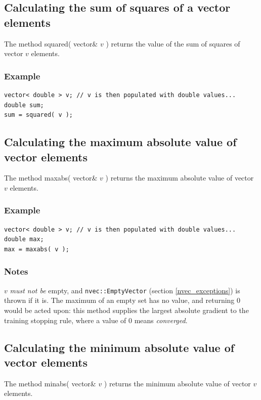\documentclass{report}
\begin{document}
\subsection{Calculating the sum of squares of a vector elements}

The method squared( vector\& $v$ ) returns the value of the sum of
squares of vector $v$ elements.

\subsubsection{Example}
\begin{verbatim}
vector< double > v; // v is then populated with double values...
double sum;
sum = squared( v );
\end{verbatim}

\subsection{Calculating the maximum absolute value of vector elements}

The method maxabs( vector\& $v$ ) returns the maximum absolute value
of vector $v$ elements.

\subsubsection{Example}
\begin{verbatim}
vector< double > v; // v is then populated with double values...
double max;
max = maxabs( v );
\end{verbatim}

\subsubsection{Notes}
$v$ {\em must not be} empty, and \texttt{nvec::EmptyVector} (section
\ref{nvec_exceptions}) is thrown if it is.  The maximum of an empty set
has no value, and returning 0 would be acted upon: this method supplies
the largest absolute gradient to the training stopping rule, where a
value of 0 means {\em converged}.

\subsection{Calculating the minimum absolute value of vector elements}

The method minabs( vector\& $v$ ) returns the minimum absolute value
of vector $v$ elements.
\end{document}
